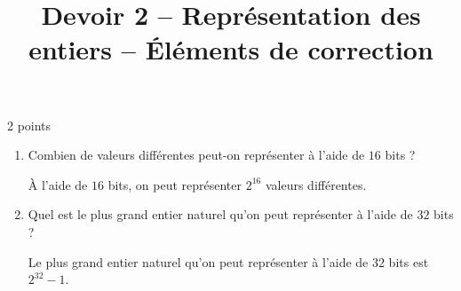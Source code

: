 \documentclass[a4paper,dvipsnames]{article}
\title{Devoir 2 -- Représentation des entiers -- Éléments de correction}
\author{}
\date{}
\begin{document}
\renewcommand{\contentsname}{}

\pagestyle{fancy}

\begin{tcolorbox}[colframe=blue!75, colback=blue!45, valign=center, height=1.5cm, top=5mm]
  \maketitle
\end{tcolorbox}


\vspace{1cm}

\thispagestyle{fancy}

\begin{exercice}{2 points}{}
 \begin{enumerate}
   \item Combien de valeurs différentes peut-on représenter à l'aide de $16$ bits ?

     \begin{correction}
       À l'aide de $16$ bits, on peut représenter $2^{16}$ valeurs différentes.
     \end{correction}
     
   \item Quel est le plus grand entier naturel qu'on peut représenter à l'aide de $32$ bits ?

     \begin{correction}
       Le plus grand entier naturel qu'on peut représenter à l'aide de $32$ bits est $2^{32}-1$.
     \end{correction}
     
 \end{enumerate} 
\end{exercice}

\medskip
\end{document}
